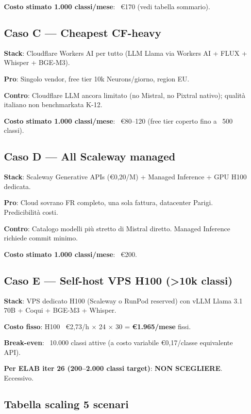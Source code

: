 \documentclass[12pt,a4paper]{article}
\begin{document}
\textbf{Costo stimato 1.000 classi/mese}: ~€170 (vedi tabella sommario).

\subsection{Caso C --- Cheapest CF-heavy}

\textbf{Stack}: Cloudflare Workers AI per tutto (LLM Llama via Workers AI + FLUX + Whisper + BGE-M3).

\textbf{Pro}: Singolo vendor, free tier 10k Neurons/giorno, region EU.

\textbf{Contro}: Cloudflare LLM ancora limitato (no Mistral, no Pixtral nativo); qualità italiano non benchmarkata K-12.

\textbf{Costo stimato 1.000 classi/mese}: ~€80--120 (free tier coperto fino a ~500 classi).

\subsection{Caso D --- All Scaleway managed}

\textbf{Stack}: Scaleway Generative APIs (€0,20/M) + Managed Inference + GPU H100 dedicata.

\textbf{Pro}: Cloud sovrano FR completo, una sola fattura, datacenter Parigi. Predicibilità costi.

\textbf{Contro}: Catalogo modelli più stretto di Mistral diretto. Managed Inference richiede commit minimo.

\textbf{Costo stimato 1.000 classi/mese}: ~€200.

\subsection{Caso E --- Self-host VPS H100 (>10k classi)}

\textbf{Stack}: VPS dedicato H100 (Scaleway o RunPod reserved) con vLLM Llama 3.1 70B + Coqui + BGE-M3 + Whisper.

\textbf{Costo fisso}: H100 ~€2,73/h $\times$ 24 $\times$ 30 = \textbf{€1.965/mese} fissi.

\textbf{Break-even}: ~10.000 classi attive (a costo variabile €0,17/classe equivalente API).

\textbf{Per ELAB iter 26 (200--2.000 classi target)}: \textbf{NON SCEGLIERE}. Eccessivo.

\subsection{Tabella scaling 5 scenari}
\end{document}
